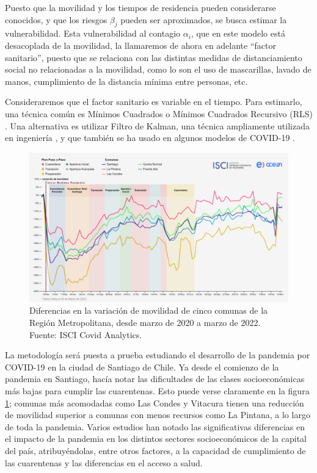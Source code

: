 \begin{intro}
Puesto que la movilidad y los tiempos de residencia pueden considerarse conocidos, y que los riesgos \(\beta_j\) pueden ser aproximados, se busca estimar la vulnerabilidad. Esta vulnerabilidad al contagio \(\alpha_i\), que en este modelo está desacoplada de la movilidad, la llamaremos de ahora en adelante ``factor sanitario'', puesto que se relaciona con las distintas medidas de distanciamiento social no relacionadas a la movilidad, como lo son el uso de mascarillas, lavado de manos, cumplimiento de la distancia mínima entre personas, etc.

Consideraremos que el factor sanitario es variable en el tiempo. Para estimarlo, una técnica común es Mínimos Cuadrados o Mínimos Cuadrados Recursivo (RLS) \cite{Sameni2020}\cite{Piccolomini2020}.
Una alternativa es utilizar Filtro de Kalman, una técnica ampliamente utilizada en ingeniería \cite{Auger2013}, y que también se ha usado en algunos modelos de COVID-19 \cite{Hasan2020}\cite{Song2021}\cite{Sameni2020}.


\begin{figure}[h]
\centering
\includegraphics[width=\textwidth]{img/metodologia/datos/movilidad-RM.png}
\caption[Diferencias en la variación de movilidad de cinco comunas de la Región Metropolitana.]{Diferencias en la variación de movilidad de cinco comunas de la Región Metropolitana, desde marzo de 2020 a marzo de 2022. Fuente: ISCI Covid Analytics.}
\label{img:ISCI-movilidad-RM-1}
\end{figure}

La metodología será puesta a prueba estudiando el desarrollo de la pandemia por COVID-19 en la ciudad de Santiago de Chile. Ya desde el comienzo de la pandemia en Santiago, \cite{Olivares2020} hacía notar las dificultades de las clases socioeconómicas más bajas para cumplir las cuarentenas. Esto puede verse claramente en la figura \ref{img:ISCI-movilidad-RM-1}; comunas más acomodadas como Las Condes y Vitacura tienen una reducción de movilidad superior a comunas con menos recursos como La Pintana, a lo largo de toda la pandemia. Varios estudios \cite{Mena2021}\cite{Bennett2021}\cite{Gozzi2021} han notado las significativas diferencias en el impacto de la pandemia en los distintos sectores socioeconómicos de la capital del país, atribuyéndolas, entre otros factores, a la capacidad de cumplimiento de las cuarentenas y las diferencias en el acceso a salud.


\end{intro}
